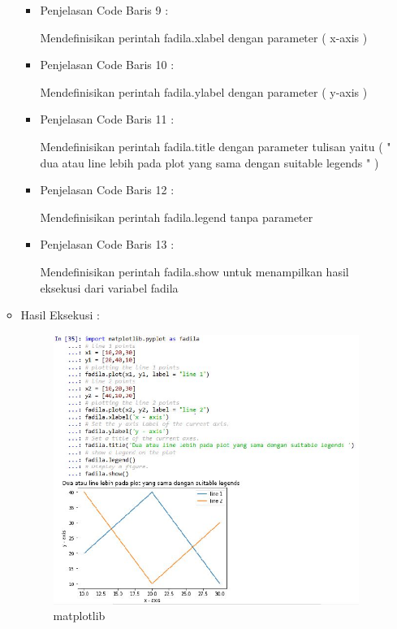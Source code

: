 \begin{enumerate}
\begin{itemize}
\begin{itemize}
\item Penjelasan Code Baris 9 :
\par Mendefinisikan perintah fadila.xlabel dengan parameter ( x-axis )
\item Penjelasan Code Baris 10 :
\par Mendefinisikan perintah fadila.ylabel dengan parameter ( y-axis )
\item Penjelasan Code Baris 11 :
\par Mendefinisikan perintah fadila.title dengan parameter tulisan yaitu ( " dua atau line lebih pada plot yang sama dengan suitable legends " )
\item Penjelasan Code Baris 12 :
\par Mendefinisikan perintah fadila.legend tanpa parameter
\item Penjelasan Code Baris 13 :
\par Mendefinisikan perintah fadila.show untuk menampilkan hasil eksekusi dari variabel fadila
\end{itemize}
\item Hasil Eksekusi :
\par
\par
\begin{figure}[ht]
\centering
\includegraphics[scale=0.3]{figures/matplotlibfadila.jpg}
\caption{matplotlib}
\label{contoh}
\end{figure}
\par
\end{itemize}


\end{enumerate}
